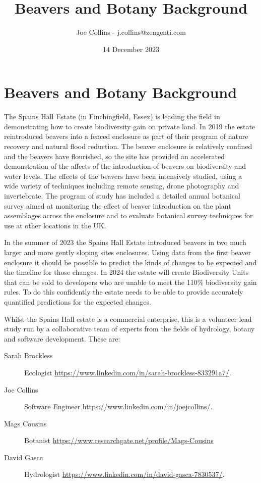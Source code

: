 \documentclass{roles}
\title{Beavers and Botany Background}
\author{Joe Collins - j.collins@zengenti.com}
\date{14 December 2023}
\begin{document}
\maketitle

\section*{Beavers and Botany Background}

The Spains Hall Estate
(in Finchingfield, Essex)
is leading the field in demonstrating
how to create biodiversity gain on private land.
In 2019 the estate reintroduced beavers into a fenced enclosure
as part of their program of nature recovery and natural flood reduction.
The beaver enclosure is relatively confined
and the beavers have flourished,
so the site has provided an accelerated demonstration of the affects of the introduction of beavers
on biodiversity and water levels.
The effects of the beavers have been intensively studied,
using a wide variety of techniques including remote sensing, drone photography and invertebrate.
The program of study has included a detailed annual botanical survey
aimed at monitoring the effect of beaver introduction on the plant assemblages across the enclosure
and to evaluate botanical survey techniques for use at other locations in the UK.

In the summer of 2023 the Spains Hall Estate
introduced beavers in two much larger and more gently sloping sites enclosures.
Using data from the first beaver enclosure
it should be possible to predict the kinds of changes to be expected and the timeline for those changes.
In 2024 the estate will create Biodiversity Units that can be sold to developers
who are unable to meet the 110\% biodiversity gain rules.
To do this confidently the estate needs to be able to
provide accurately quantified predictions for the expected changes.

Whilst the Spains Hall estate is a commercial enterprise,
this is a volunteer lead study
run by a collaborative team of experts from the fields of hydrology, botany and software development.
These are:

\begin{description}
    \item[Sarah Brockless] Ecologist \href{https://www.linkedin.com/in/sarah-brockless-833291a7/}{https://www.linkedin.com/in/sarah-brockless-833291a7/}.
    \item[Joe Collins] Software Engineer \href{https://www.linkedin.com/in/joejcollins/}{https://www.linkedin.com/in/joejcollins/}.
    \item[Mags Cousins] Botanist \href{https://www.researchgate.net/profile/Mags-Cousins}{https://www.researchgate.net/profile/Mags-Cousins}
    \item[David Gasca] Hydrologist \href{https://www.linkedin.com/in/david-gasca-7830537/}{https://www.linkedin.com/in/david-gasca-7830537/}.
\end{description}
\end{document}
